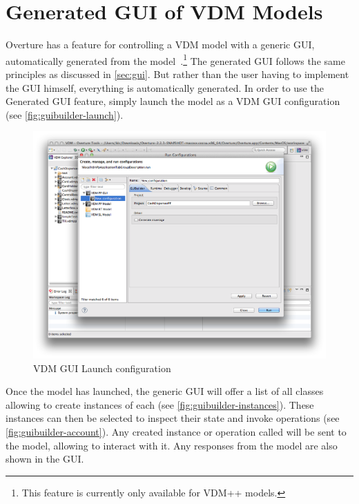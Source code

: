 

\section{Generated GUI of VDM Models}
\label{sec:guibuilder}

Overture has a feature for controlling a VDM model with a generic GUI,
automatically generated from the model~\cite{nunes&11}.\footnote{This feature is currently only
available for VDM++ models.} The generated GUI follows the same
principles as discussed in \autoref{sec:gui}. But rather than the user having to
implement the GUI himself, everything is automatically generated.
  In order to use the Generated GUI feature, simply launch the model
as a VDM  GUI configuration (see \autoref{fig:guibuilder-launch}).


\begin{figure}[!ht]
\begin{center}
  \includegraphics[width=\textwidth]{screendumps/guibuilder-launch}
  \caption[labelInTOC]{VDM GUI Launch configuration}
  \label{fig:guibuilder-launch}
\end{center}
\end{figure}


Once the model has launched, the generic GUI will offer a list of all
classes allowing to create instances of each (see
\autoref{fig:guibuilder-instances}). These instances can then be selected to
inspect their state and invoke operations (see
\autoref{fig:guibuilder-account}). Any created instance or operation called will
be sent to the model, allowing to interact with it. Any responses from the
model are also shown in the GUI.


